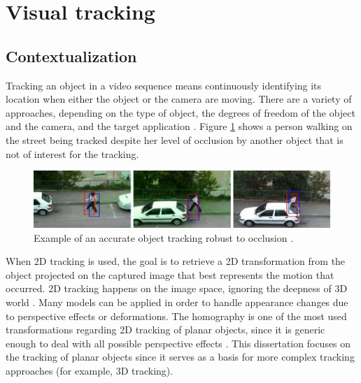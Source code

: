 

\section{Visual tracking} %
\label{sec:basic_concepts:visual_tracking}

\subsection{Contextualization} %
\label{sub:basic_concepts:visual_tracking:contextualization}

Tracking an object in a video sequence means continuously identifying its location when either the object or the camera are moving. There are a variety of approaches, depending on the type of object, the degrees of freedom of the object and the camera, and the target application \cite{Lepetit2005,Teichrieb2007}. Figure \ref{figure:tracking_occlusion} shows a person walking on the street being tracked despite her level of occlusion by another object that is not of interest for the tracking.

\begin{figure}[!htb]
  \centering
  \includegraphics[width=\linewidth]{chapters/basic_concepts/tracking_occlusion.png}
  \caption{Example of an accurate object tracking robust to occlusion \cite{Jia2012}.}
  \label{figure:tracking_occlusion}
\end{figure}

When 2D tracking is used, the goal is to retrieve a 2D transformation from the object projected on the captured image that best represents the motion that occurred. 2D tracking happens on the image space, ignoring the deepness of 3D world \cite{Li2008}. Many models can be applied in order to handle appearance changes due to perspective effects or deformations. The homography is one of the most used transformations regarding 2D tracking of planar objects, since it is generic enough to deal with all possible perspective effects \cite{CMei2008}. This dissertation focuses on the tracking of planar objects since it serves as a basis for more complex tracking approaches (for example, 3D tracking).

